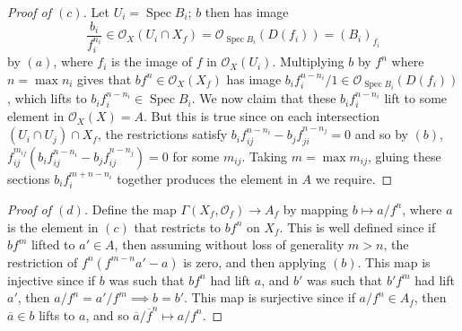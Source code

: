 \documentclass[10pt]{article}
\theoremstyle{definition}
\theoremstyle{remark}
\numberwithin{equation}{section}
\numberwithin{figure}{subsubsection}
\DeclareMathOperator{\Spec}{Spec}
\newcommand{\OO}{\mathcal{O}}
\begin{document}
\begin{proof}[Proof of $(c)$]
  Let $U_i = \Spec B_i$; $b$ then has image
  \begin{equation*}
    \frac{b_i}{f_i^{n_i}} \in \OO_X(U_i \cap X_f) = \OO_{\Spec B_i}(D(f_i)) = (B_i)_{f_i}
  \end{equation*}
  by $(a)$, where $f_i$ is the image of $f$ in $\OO_X(U_i)$. Multiplying $b$ by $f^n$ where $n = \max n_i$ gives that $bf^n \in \OO_X(X_f)$ has image $b_if_i^{n-n_i}/1 \in \OO_{\Spec B_i}(D(f_i))$, which lifts to $b_if_i^{n-n_i} \in \Spec B_i$. We now claim that these $b_if_i^{n-n_i}$ lift to some element in $\OO_X(X) = A$. But this is true since on each intersection $(U_i \cap U_j) \cap X_f$, the restrictions satisfy $b_if_{ij}^{n-n_i} - b_jf_{ji}^{n-n_j} = 0$ and so by $(b)$, $f_{ij}^{m_{ij}}(b_if_{ij}^{n-n_i} - b_jf_{ij}^{n-n_j}) = 0$ for some $m_{ij}$. Taking $m = \max m_{ij}$, gluing these sections $b_if_i^{m+n-n_i}$ together produces the element in $A$ we require.
\end{proof}
\begin{proof}[Proof of $(d)$]
  Define the map $\Gamma(X_f,\OO_f) \to A_f$ by mapping $b \mapsto a/f^n$, where $a$ is the element in $(c)$ that restricts to $bf^n$ on $X_f$. This is well defined since if $bf^m$ lifted to $a' \in A$, then assuming without loss of generality $m > n$, the restriction of $f^{n}(f^{m-n}a'-a)$ is zero, and then applying $(b)$. This map is injective since if $b$ was such that $bf^n$ had lift $a$, and $b'$ was such that $b'f^m$ had lift $a'$, then $a/f^n = a'/f^m \implies b = b'$. This map is surjective since if $a/f^n \in A_f$, then $\overline{a} \in b$ lifts to $a$, and so $\overline{a}/\overline{f}^n \mapsto a/f^n$.
\end{proof}
\end{document}

